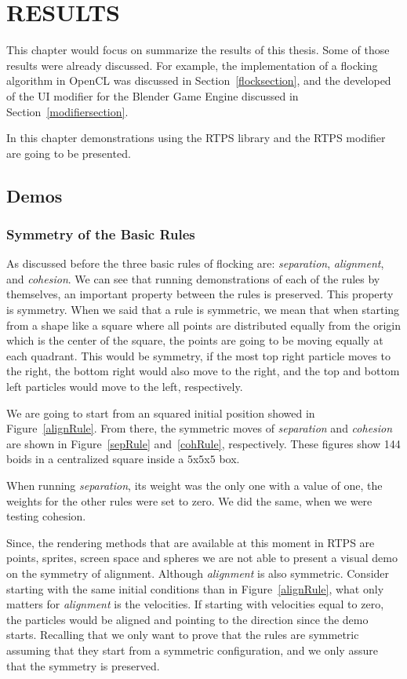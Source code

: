 \chapter{RESULTS}\label{resultsChapter}

This chapter would focus on summarize the results of this thesis. Some of those results were already discussed. For example, the implementation of a flocking algorithm in OpenCL was discussed in Section~\ref{flocksection}, and the developed of the UI modifier for the Blender Game Engine discussed in Section~\ref{modifiersection}. 

In this chapter demonstrations using the RTPS library and the RTPS modifier are going to be presented.

\section{Demos}

\subsection{Symmetry of the Basic Rules}
As discussed before the three basic rules of flocking are: \textit{separation}, \textit{alignment}, and \textit{cohesion}. We can see that running demonstrations of each of the rules by themselves, an important property between the rules is preserved. This property is symmetry. When we said that a rule is symmetric, we mean that when starting from a shape like a square where all points are distributed equally from the origin which is the center of the square, the points are going to be moving equally at each quadrant. This would be symmetry, if the most top right particle moves to the right, the bottom right would also move to the right, and the top and bottom left particles would move to the left, respectively.

We are going to start from an squared initial position showed in Figure~\ref{alignRule}. From there, the symmetric moves of \textit{separation} and \textit{cohesion} are shown in Figure~\ref{sepRule} and~\ref{cohRule}, respectively. These figures show 144 boids in a centralized square inside a $5$x$5$x$5$ box.

When running \textit{separation}, its weight was the only one with a value of one, the weights for the other rules were set to zero. We did the same, when we were testing cohesion.

Since, the rendering methods that are available at this moment in RTPS are points, sprites, screen space and spheres we are not able to present a visual demo on the symmetry of alignment. Although \textit{alignment} is also symmetric. Consider starting with the same initial conditions than in Figure~\ref{alignRule}, what only matters for \textit{alignment} is the velocities. If starting with velocities equal to zero, the particles would be aligned and pointing to the direction since the demo starts. Recalling that we only want to prove that the rules are symmetric assuming that they start from a symmetric configuration, and we only assure that the symmetry is preserved.

